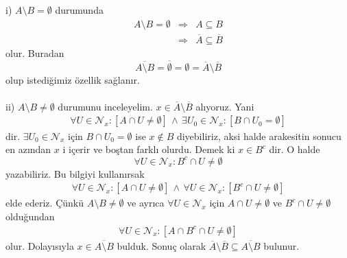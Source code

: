 \documentclass[10pt,a4paper]{article}
\theoremstyle{definition} \newtheorem{teo}{Teorem}
\begin{document}
\begin{enumerate}
\begin{enumerate}
i) $A\setminus B= \emptyset$ durumunda
\begin{eqnarray}
A\setminus B=\emptyset &\Rightarrow & A\subseteq B \nonumber\\
&\Rightarrow & \overline{A}\subseteq \overline{B}  \nonumber
\end{eqnarray}
olur. Buradan
\begin{displaymath}
\overline{A\setminus B}= \overline{\emptyset }=\emptyset =\overline{A}\setminus \overline{B}
\end{displaymath}
olup istediğimiz özellik sağlanır.\\
\\
ii) $A\setminus B\neq \emptyset$ durumunu inceleyelim. $x\in \overline{A}\setminus \overline{B}$ alıyoruz. Yani
\begin{eqnarray}
\forall U\in \mathcal{N}_{x} :[A \cap U\neq\emptyset ] \, \wedge\, \exists U_{0}\in \mathcal{N}_{x} :[B \cap U_{0}=\emptyset]\nonumber 
\end{eqnarray}
dir. $\exists U_{0}\in \mathcal{N}_{x} $ için $B \cap U_{0}=\emptyset $ ise $x\notin B$ diyebiliriz, aksi halde arakesitin sonucu en azından $x$ i içerir ve boştan farklı olurdu. Demek ki $x\in B^{c}$ dir. O halde
\begin{displaymath}
\forall U\in \mathcal{N}_{x}: B^{c}\cap U\neq \emptyset
\end{displaymath}
yazabiliriz. Bu bilgiyi kullanırsak
\begin{eqnarray}
\forall U\in \mathcal{N}_{x} :[A \cap U\neq\emptyset]\, \wedge\, \forall U\in \mathcal{N}_{x} :[B^{c} \cap U\neq\emptyset]\nonumber
\end{eqnarray}
elde ederiz. Çünkü $A\setminus B \neq \emptyset$ ve ayrıca $\forall U\in \mathcal{N}_{x}$ için $A\cap U\neq \emptyset$ ve $B^{c}\cap U\neq \emptyset$ olduğundan 
\begin{eqnarray}
\forall U\in \mathcal{N}_{x} :[A \cap B^{c}\cap U\neq\emptyset] \nonumber
\end{eqnarray}
olur. Dolayısıyla $x\in \overline{A\setminus B}$ bulduk. Sonuç olarak $\overline{A}\setminus \overline{B} \subseteq \overline{A\setminus B}$ bulunur.
\end{enumerate}



\end{enumerate}
\end{document}

